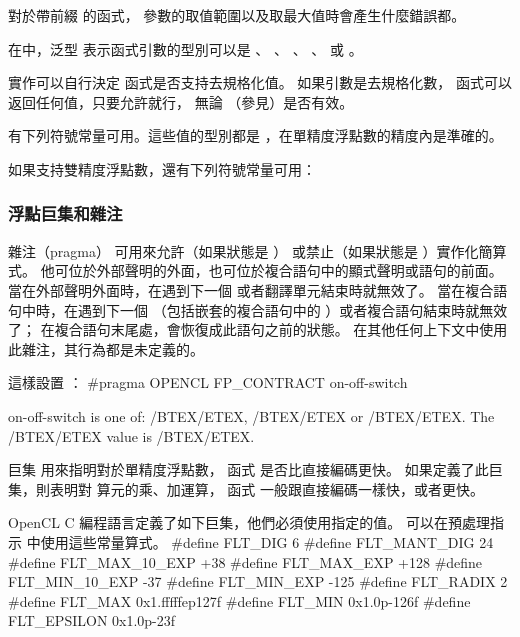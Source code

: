 \startnotepar
對於帶前綴  的函式，
參數的取值範圍以及取最大值時會產生什麼錯誤都。
\stopnotepar

在中，泛型  表示函式引數的型別可以是
 、 、 、 、
  或 。

{}

實作可以自行決定  函式是否支持去規格化值。
如果引數是去規格化數，  函式可以返回任何值，只要允許就行，
無論  （參見）是否有效。

有下列符號常量可用。這些值的型別都是 ，在單精度浮點數的精度內是準確的。


如果支持雙精度浮點數，還有下列符號常量可用：


\subsubsection{浮點巨集和雜注}

雜注（pragma）  可用來允許（如果狀態是 ）
或禁止（如果狀態是 ）實作化簡算式。
他可位於外部聲明的外面，也可位於複合語句中的顯式聲明或語句的前面。
當在外部聲明外面時，在遇到下一個  或者翻譯單元結束時就無效了。
當在複合語句中時，在遇到下一個 
（包括嵌套的複合語句中的 ）或者複合語句結束時就無效了；
在複合語句末尾處，會恢復成此語句之前的狀態。
在其他任何上下文中使用此雜注，其行為都是未定義的。

這樣設置 ：
\startclc
#pragma OPENCL FP_CONTRACT on-off-switch

on-off-switch is one of:
	/BTEX/ETEX, /BTEX/ETEX or /BTEX/ETEX.
	The /BTEX/ETEX value is /BTEX/ETEX.
\stopclc

巨集  用來指明對於單精度浮點數，
函式  是否比直接編碼更快。
如果定義了此巨集，則表明對  算元的乘、加運算，
函式  一般跟直接編碼一樣快，或者更快。

OpenCL C 編程語言定義了如下巨集，他們必須使用指定的值。
可以在預處理指示  中使用這些常量算式。
\startclc
#define FLT_DIG		6
#define FLT_MANT_DIG	24
#define FLT_MAX_10_EXP	+38
#define FLT_MAX_EXP	+128
#define FLT_MIN_10_EXP	-37
#define FLT_MIN_EXP	-125
#define FLT_RADIX	2
#define FLT_MAX		0x1.fffffep127f
#define FLT_MIN		0x1.0p-126f
#define FLT_EPSILON	0x1.0p-23f
\stopclc

